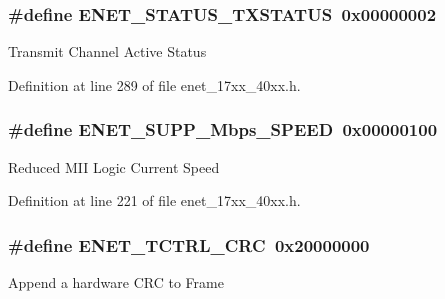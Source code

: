 \subsubsection[{\texorpdfstring{E\+N\+E\+T\+\_\+\+S\+T\+A\+T\+U\+S\+\_\+\+T\+X\+S\+T\+A\+T\+US}{ENET_STATUS_TXSTATUS}}]{\setlength{\rightskip}{0pt plus 5cm}\#define E\+N\+E\+T\+\_\+\+S\+T\+A\+T\+U\+S\+\_\+\+T\+X\+S\+T\+A\+T\+US~0x00000002}\hypertarget{group__ENET__17XX__40XX_gae74d3a5997ed8bf6618a4896b12403e8}{}\label{group__ENET__17XX__40XX_gae74d3a5997ed8bf6618a4896b12403e8}
Transmit Channel Active Status 

Definition at line 289 of file enet\+\_\+17xx\+\_\+40xx.\+h.

\subsubsection[{\texorpdfstring{E\+N\+E\+T\+\_\+\+S\+U\+P\+P\+\_\+100\+Mbps\+\_\+\+S\+P\+E\+ED}{ENET_SUPP_100Mbps_SPEED}}]{\setlength{\rightskip}{0pt plus 5cm}\#define E\+N\+E\+T\+\_\+\+S\+U\+P\+P\+\_\+Mbps\+\_\+\+S\+P\+E\+ED~0x00000100}\hypertarget{group__ENET__17XX__40XX_ga66870c22b0f10f275b7b2c1e6d0709a0}{}\label{group__ENET__17XX__40XX_ga66870c22b0f10f275b7b2c1e6d0709a0}
Reduced M\+II Logic Current Speed 

Definition at line 221 of file enet\+\_\+17xx\+\_\+40xx.\+h.

\subsubsection[{\texorpdfstring{E\+N\+E\+T\+\_\+\+T\+C\+T\+R\+L\+\_\+\+C\+RC}{ENET_TCTRL_CRC}}]{\setlength{\rightskip}{0pt plus 5cm}\#define E\+N\+E\+T\+\_\+\+T\+C\+T\+R\+L\+\_\+\+C\+RC~0x20000000}\hypertarget{group__ENET__17XX__40XX_gac92f044f648d5e928f609e9b606b92b1}{}\label{group__ENET__17XX__40XX_gac92f044f648d5e928f609e9b606b92b1}
Append a hardware C\+RC to Frame 

